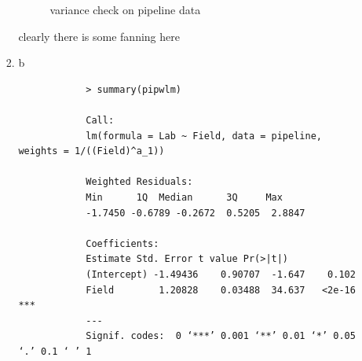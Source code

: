 \documentclass[11pt]{article}
\begin{document}
\begin{enumerate}
\begin{enumerate}
\begin{enumerate}
\begin{figure}[H]
			\caption[paic]{variance check on pipeline data}
			\label{divusav}
		\end{figure}
		clearly there is some fanning here
		\item b
		\begin{verbatim}
			> summary(pipwlm)
			
			Call:
			lm(formula = Lab ~ Field, data = pipeline, weights = 1/((Field)^a_1))
			
			Weighted Residuals:
			Min      1Q  Median      3Q     Max 
			-1.7450 -0.6789 -0.2672  0.5205  2.8847 
			
			Coefficients:
			Estimate Std. Error t value Pr(>|t|)    
			(Intercept) -1.49436    0.90707  -1.647    0.102    
			Field        1.20828    0.03488  34.637   <2e-16 ***
			---
			Signif. codes:  0 ‘***’ 0.001 ‘**’ 0.01 ‘*’ 0.05 ‘.’ 0.1 ‘ ’ 1
			

\end{verbatim}
\end{enumerate}
\end{enumerate}
\end{enumerate}
\end{document}

